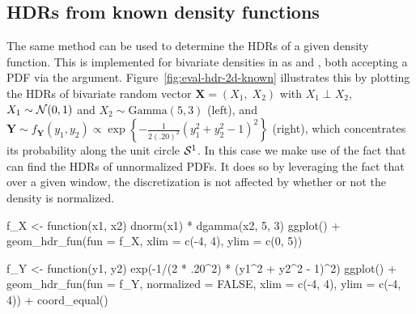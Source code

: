 

\pagebreak
\subsection{HDRs from known density functions}\label{sec:hdr-known}


The same method can be used to determine the HDRs of a given density function.
This is implemented for bivariate densities in  as  and , both accepting a PDF via the  argument.
Figure~\ref{fig:eval-hdr-2d-known} illustrates this by plotting the HDRs of bivariate random vector $\mathbf{X} = (X_1, \; X_2)$ with $X_1 \perp X_2$, $X_1 \sim \mathcal{N}(0, 1)$ and $X_2 \sim \mathrm{Gamma}(5, 3)$ (left),
and $ \mathbf{Y} \sim f_{\mathbf{Y}}(y_1, y_2) \propto \exp \left\{ -\frac{1}{2 (.20)^2} (y_1^2 + y_2^2 - 1)^2 \right\}$ (right), which concentrates its probability along the unit circle $\mathcal{S}^1$.
In this case we make use of the fact that  can find the HDRs of unnormalized PDFs.
It does so by leveraging the fact that over a given window, the discretization is not affected by whether or not the density is normalized.

\begin{knitrout}
\color{fgcolor}\begin{kframe}
\begin{example}
f_X <- function(x1, x2) dnorm(x1) * dgamma(x2, 5, 3)
ggplot() + geom_hdr_fun(fun = f_X, xlim = c(-4, 4), ylim = c(0, 5))
\end{example}
\end{kframe}
\end{knitrout}
\begin{knitrout}
\color{fgcolor}\begin{kframe}
\begin{example}
f_Y <- function(y1, y2) exp(-1/(2 * .20^2) * (y1^2 + y2^2 - 1)^2)
ggplot() +
  geom_hdr_fun(fun = f_Y, normalized = FALSE, xlim = c(-4, 4), ylim = c(-4, 4)) +
  coord_equal()
\end{example}
\end{kframe}
\end{knitrout}

